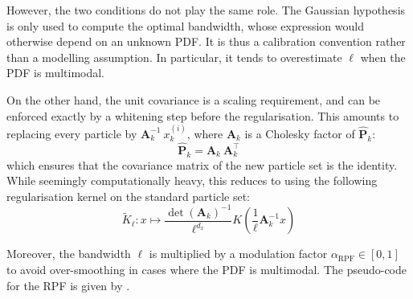 However, the two conditions do not play the same role. The Gaussian hypothesis is only used to compute the optimal bandwidth, whose expression would otherwise depend on an unknown PDF. It is thus a calibration convention rather than a modelling assumption. In particular, it tends to overestimate $\ell$ when the PDF is multimodal.

On the other hand, the unit covariance is a scaling requirement, and can be enforced exactly by a whitening step before the regularisation. This amounts to replacing every particle by $\mathbf{A}_k^{-1}\:x_k^{(i)}$, where $\mathbf{A}_k$ is a Cholesky factor of $\hat{\mathbf{P}}_k$:
\begin{equation}
	\hat{\mathbf{P}}_k=\mathbf{A}_k\:\mathbf{A}_k^\top
\end{equation}
which ensures that the covariance matrix of the new particle set is the identity. While seemingly computationally heavy, this reduces to using the following regularisation kernel on the standard particle set:
\begin{equation}
	\tilde{K}_\ell:x\mapsto\frac{\det(\mathbf{A}_k)^{-1}}{\ell^{d_x}}K\left(\frac{1}{\ell}\mathbf{A}_k^{-1}x\right)
\end{equation}

Moreover, the bandwidth $\ell$ is multiplied by a modulation factor $\alpha_{\mathrm{RPF}}\in[0,1]$ to avoid over-smoothing in cases where the PDF is multimodal. The pseudo-code for the RPF is given by .

\begin{algorithm}[!htb]
	\begin{algorithmic}
	\EndIf
	\end{algorithmic}\caption{Regularised Particle Filter}\label{alg:RPF}
\end{algorithm}

